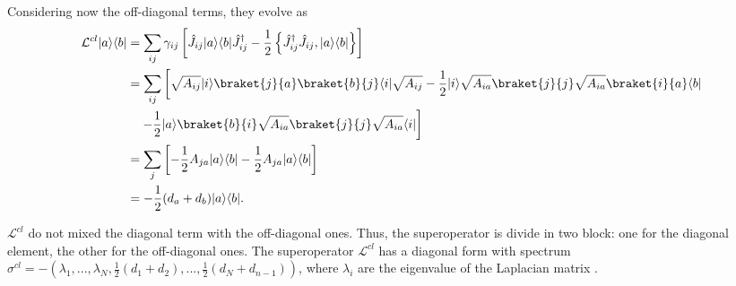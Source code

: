 Considering now the off-diagonal terms, they  evolve as 
\begin{equation}
    \begin{split}
        \mathcal{L}^{cl}\ket{a}\bra{b} &= \sum_{ij}\gamma_{ij}\left[\hat J_{ij} \ket{a}\bra{b}\hat J_{ij}^\dagger -\frac{1}{2} \left\{ \hat J_{ij}^\dagger \hat J_{ij}, \ket{a}\bra{b}\right\}\right]\\
        &= \sum_{ij}\left[\sqrt{A_{ij}}\ket{i}\braket{j}{a}\braket{b}{j}\bra{i}\sqrt{A_{ij}} -\frac{1}{2}\ket{i}\sqrt{A_{ia}}\braket{j}{j}\sqrt{A_{ia}}\braket{i}{a}\bra{b}\right.\\ 
        &\quad\left. - \frac{1}{2} \ket{a}\braket{b}{i}\sqrt{A_{ia}}\braket{j}{j}\sqrt{A_{ia}}\bra{i}\right]\\
        &= \sum_{j}\left[-\frac{1}{2} A_{ja}\ket{a}\bra{b} - \frac{1}{2} A_{ja}\ket{a}\bra{b}\right]\\
        &= - \frac{1}{2}(d_a + d_b)\ket{a}\bra{b}.
    \end{split} 
\end{equation}

$\mathcal{L}^{cl}$ do not mixed the diagonal term with the off-diagonal ones. Thus, the superoperator is divide in two block: one for the diagonal element, the other for the off-diagonal ones.
The superoperator $\mathcal{L}^{cl}$ has a diagonal form with spectrum $\sigma^{cl} = -(\lambda_1,...,\lambda_N,\frac{1}{2}(d_1 + d_2),...,\frac{1}{2}(d_N + d_{n-1}))$, where $\lambda_i$ are the eigenvalue of the Laplacian matrix \cite{Bruderer_Plenio}.


\begin{comment}

Instead if we consider the jump operator as $\hat J_{ij} =\sqrt{L_{ij}}\ket{i\bra{j}}$, the evolution of the diagonal and off-diagonals term become 
\begin{equation}
    \begin{split}
        \mathcal{L}^{cl}\ket{a}\bra{a} &=  \sum_{ij}\left[\hat J_{ij} \ket{a}\bra{a}\hat J_{ij}^\dagger -\frac{1}{2} \left\{ \hat J_{ij}^\dagger \hat J_{ij}, \ket{a}\bra{a}\right\}\right]\\
        &= \sum_{ij}\left[\sqrt{L_{ij}}\ket{i}\braket{j}{a}\braket{a}{j}\bra{i}\sqrt{L_{ij}} -\frac{1}{2}\ket{i}\sqrt{L_{ia}}\braket{j}{j}\sqrt{L_{ia}}\braket{i}{a}\bra{a}\right.\\
        &\quad \left. - \frac{1}{2} \ket{a}\braket{a}{i}\sqrt{L_{ia} v}\braket{j}{j}\sqrt{L_{ia}}\bra{i}\right]\\
        &= \sum_{i}\left[L_{ia} \ket{i}\bra{i} -L_{ia}\ket{a}\bra{a}\right]\\
        &=\sum_{i} L_{ai} \ket{i}\bra{i}.
    \end{split}
\end{equation}
Since $\sum_i L_{ia} = 0$. For the same motivation, the off-diagonal terms are killed by $\mathcal{L}^{cl}$.
Both the two possible jump operator recover the classical random walk over a network behavior, but they create  different evolution for the density matrix.
\end{comment}




